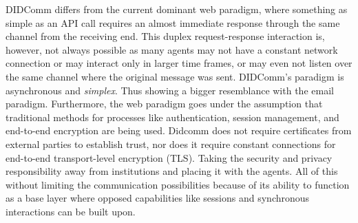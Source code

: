 








DIDComm differs from the current dominant web paradigm, where something as simple as an API call requires an almost immediate response through the same channel from the receiving end. This duplex request-response interaction is, however, not always possible as many agents may not have a constant network connection or may interact only in larger time frames, or may even not listen over the same channel where the original message was sent. DIDComm's paradigm is asynchronous and \emph{simplex}. Thus showing a bigger resemblance with the email paradigm. Furthermore, the web paradigm goes under the assumption that traditional methods for processes like authentication, session management, and end-to-end encryption are being used. Didcomm does not require certificates from external parties to establish trust, nor does it require constant connections for end-to-end transport-level encryption (TLS). Taking the security and privacy responsibility away from institutions and placing it with the agents. All of this without limiting the communication possibilities because of its ability to function as a base layer where opposed capabilities like sessions and synchronous interactions can be built upon. \cite{curren_looker_terbu_2020}

